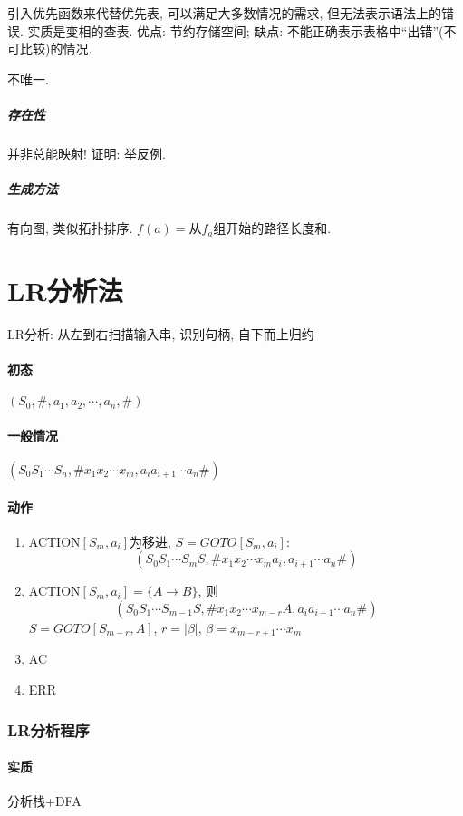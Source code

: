             引入优先函数来代替优先表, 可以满足大多数情况的需求, 但无法表示语法上的错误. 实质是变相的查表. 优点: 节约存储空间; 缺点: 不能正确表示表格中``出错''(不可比较)的情况.

            不唯一.

            \subparagraph{存在性} 并非总能映射! 证明: 举反例.

            \subparagraph{生成方法} 有向图, 类似拓扑排序. $f(a)=$从$f_a$组开始的路径长度和.

    \section{LR分析法}

        LR分析: 从左到右扫描输入串, 识别句柄, 自下而上归约

        \paragraph{初态}

            $(S_0, \#, a_1,a_2, \cdots, a_n, \#)$

        \paragraph{一般情况}

            $(S_0S_1\cdots S_n, \#x_1x_2\cdots x_m, a_ia_{i+1}\cdots a_n\#)$

        \paragraph{动作}

            \begin{enumerate}
                \item ACTION$[S_m,a_i]$为移进, $S=GOTO[S_m,a_i]$:
                    \[(S_0S_1\cdots S_mS, \#x_1x_2\cdots x_ma_i, a_{i+1}\cdots a_n\#)\]
                \item ACTION$[S_m,a_i]=\{A\to B\}$, 则
                    \[(S_0S_1\cdots S_{m-1}S, \#x_1x_2\cdots x_{m-r}A, a_ia_{i+1}\cdots a_n\#)\]
                    $S=GOTO[S_{m-r},A]$, $r=|\beta|$, $\beta=x_{m-r+1}\cdots x_m$
                \item AC
                \item ERR
            \end{enumerate}

        \subsubsection{LR分析程序}

            \paragraph{实质} 分析栈+DFA

                
